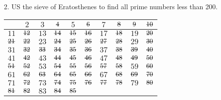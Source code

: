 \newpage
\begin{mdframed}[style=darkQuesion]
2. US the sieve of Eratosthenes to find all prime numbers less than 200.
\end{mdframed}

\begin{mdframed}[style=darkAnswer,frametitle={Joe Starr}]
    \begin{center}
        \begin{tabular}{| c | c | c | c | c | c | c | c | c | c |}
        \hline
        $ $ & $2$ & $3$ & $\msout{4}$ & $5$ & $\msout{6}$ & $7$ & $\msout{8}$ & 
        $\msout{9}$ & $\msout{10}$ \\
        \hline
        $11$ & $\msout{12}$ & $13$ & $\msout{14}$ & $\msout{15}$ & $\msout{16}$ 
        & $17$ & $\msout{18}$ & $19$ & $\msout{20}$ \\
        \hline
        $\msout{21}$ & $\msout{22}$ & $23$ & $\msout{24}$ & $\msout{25}$ & 
        $\msout{26}$ & $\msout{27}$ & $\msout{28}$ & $29$ & $\msout{30}$ \\
        \hline
        $31$ & $\msout{32}$ & $\msout{33}$ & $\msout{34}$ & $\msout{35}$ & 
        $\msout{36}$ & $37$ & $\msout{38}$ & $\msout{39}$ & $\msout{40}$ \\
        \hline
        $41$ & $\msout{42}$ & $43$ & $\msout{44}$ & $\msout{45}$ & $\msout{46}$ 
        & $47$ & $\msout{48}$ & $\msout{49}$ & $\msout{50}$ \\
        \hline
        $\msout{51}$ & $\msout{52}$ & $53$ & $\msout{54}$ & $\msout{55}$ & 
        $\msout{56}$ & $\msout{57}$ & $\msout{58}$ & $59$ & $\msout{60}$ \\
        \hline
        $61$ & $\msout{62}$ & $\msout{63}$ & $\msout{64}$ & $\msout{65}$ & 
        $\msout{66}$ & $67$ & $\msout{68}$ & $\msout{69}$ & $\msout{70}$ \\
        \hline
        $71$ & $\msout{72}$ & $73$ & $\msout{74}$ & $\msout{75}$ & $\msout{76}$ 
        & $\msout{77}$ & $\msout{78}$ & $79$ & $\msout{80}$ \\
        \hline
        $\msout{81}$ & $\msout{82}$ & $83$ & $\msout{84}$ & $\msout{85}$ & 

\end{tabular}
\end{center}
\end{mdframed}
